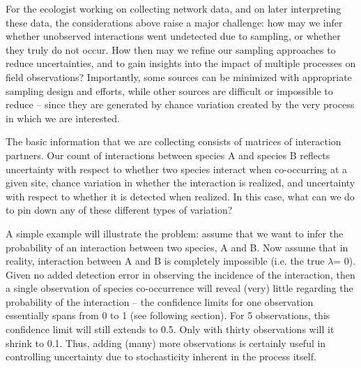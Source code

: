 \documentclass[12pt]{article}
\begin{document}
  For the ecologist working on collecting network data, and on later interpreting these data, the considerations above raise a major challenge: how may we infer whether unobserved interactions went undetected due to sampling, or whether they truly do not occur. How then may we refine our sampling approaches to reduce uncertainties, and to gain insights into the impact of multiple processes on field observations? Importantly, some sources can be minimized with appropriate sampling design and efforts, while other sources are difficult or impossible to reduce – since they are generated by chance variation created by the very process in which we are interested.


  The basic information that we are collecting consists of matrices of interaction partners. Our count of interactions between species A and species B reflects uncertainty with respect to whether two species interact when co-occurring at a given site, chance variation in whether the interaction is realized, and uncertainty with respect to whether it is detected when realized. In this case, what can we do to pin down any of these different types of variation?


  A simple example will illustrate the problem: assume that we want to infer the probability of an interaction between two species, A and B. Now assume that in reality, interaction between A and B is completely impossible (i.e. the true $\lambda$= 0). Given no added detection error in observing the incidence of the interaction, then a single observation of species co-occurrence will reveal (very) little regarding the probability of the interaction – the confidence limits for one observation essentially spans from 0 to 1 (see following section). For 5 observations, this confidence limit will still extends to 0.5. Only with thirty observations will it shrink to 0.1. Thus, adding (many) more observations is certainly useful in controlling uncertainty due to stochasticity inherent in the process itself.
\end{document}
